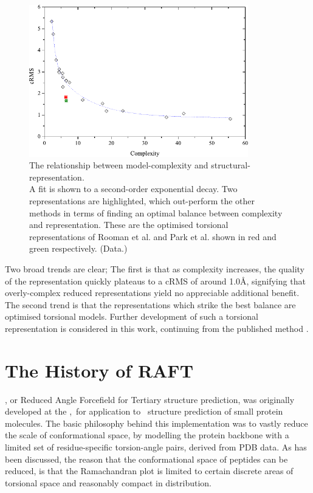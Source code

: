 \begin{figure}[hbtp]
\begin{center}
\includegraphics[width=0.85\textwidth]{./05-ReducedRep/complexity/complexity.pdf}
\caption[The relationship between model-complexity
and structural-representation]{The relationship between model-complexity
and structural-representation.\\
A fit is shown to a second-order exponential decay. Two representations are highlighted, which out-perform
the other methods in terms of finding an optimal balance between complexity and representation. These are the optimised torsional representations of Rooman et al.\cite{COMPCHEM:Rooman91}
and Park et al.\cite{METHOD:ParkLevitt} shown in red and green respectively.
(Data\cite{METHOD:ParkLevitt}.)}
\label{fig:reducedrep:complexity}
\end{center}
\end{figure}

Two broad trends are clear; The first is that as complexity increases, the quality of the representation
quickly plateaus to a cRMS of around 1.0\AA, signifying that overly-complex reduced representations yield no appreciable additional benefit. The second trend is that the representations which strike the best balance  are optimised torsional models. Further development of such a torsional representation is considered in this work, continuing from the published method 
\raft\cite{COMPCHEM:Gib2001}.
    
  
\section{The History of RAFT}

\raft\cite{COMPCHEM:Gib2001}, or Reduced Angle Forcefield for Tertiary structure prediction, was originally developed at the \uob,\ for application to \abinitio\ structure prediction of small protein molecules. The basic philosophy behind this implementation was to vastly reduce the scale of conformational space, by modelling the protein backbone with a limited set of residue-specific torsion-angle pairs, derived from PDB data.
As has been discussed, the reason that the conformational space of peptides can be reduced, is that the Ramachandran plot is limited to certain discrete areas of torsional space and reasonably compact in distribution. 


